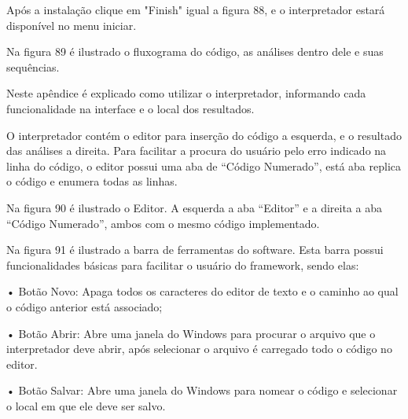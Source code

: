 \documentclass[12pt,oneside,a4paper,chapter=TITLE,section=TITLE,sumario=tradicional]{abntex2}
\begin{document}
Após a instalação clique em "Finish" igual a figura 88, e o interpretador estará disponível no menu iniciar.

\begin{figure}[H]
\end{figure}


Na figura 89 é ilustrado o fluxograma do código, as análises dentro dele e suas sequências.

\begin{figure}[H]
\end{figure}


Neste apêndice é explicado como utilizar o interpretador, informando cada funcionalidade na interface e o local dos resultados.

O interpretador contém o editor para inserção do código a esquerda, e o resultado das análises a direita. Para facilitar a procura do usuário pelo erro indicado na linha do código, o editor possui uma aba de “Código Numerado”, está aba replica o código e enumera todas as linhas. 

Na figura 90 é ilustrado o Editor. A esquerda a aba “Editor” e a direita a aba “Código Numerado”, ambos com o mesmo código implementado.

\begin{figure}[H]
\end{figure}

Na figura 91 é ilustrado a barra de ferramentas do software. Esta barra possui funcionalidades básicas para facilitar o usuário do framework, sendo elas:

•	Botão Novo: Apaga todos os caracteres do editor de texto e o caminho ao qual o código anterior está associado;

•	Botão Abrir: Abre uma janela do Windows para procurar o arquivo que o interpretador deve abrir, após selecionar o arquivo é carregado todo o código no editor.

•	Botão Salvar: Abre uma janela do Windows para nomear o código e selecionar o local em que ele deve ser salvo.
\end{document}
